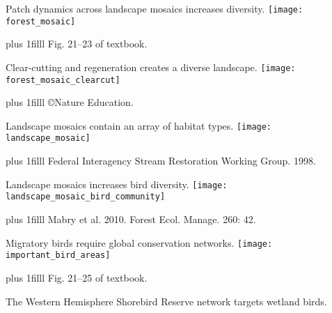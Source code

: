 \documentclass[t]{beamer}
\newcommand\imagecredit[1]{%
	\vskip0pt plus 1filll \tiny #1}%
\begin{document}
\begin{frame}[t,plain]{Patch dynamics across landscape mosaics increases diversity.}
	\centering
		\texttt{[image: forest\_mosaic]}

	\imagecredit{\hfill Fig. 21–23 of textbook.}
\end{frame}

\begin{frame}[t,plain]{Clear-cutting and regeneration creates a diverse landscape.}
	\centering
		\texttt{[image: forest\_mosaic\_clearcut]}

	\imagecredit{\hfill\copyright Nature Education.}
\end{frame}

\begin{frame}[t,plain]{Landscape mosaics contain an array of habitat types.}
	\centering
		\texttt{[image: landscape\_mosaic]}

	\imagecredit{\hfill Federal Interagency Stream Restoration Working Group. 1998.}
\end{frame}

\begin{frame}[t,plain]{Landscape mosaics increases bird diversity.}
	\centering
		\texttt{[image: landscape\_mosaic\_bird\_community]}

	\imagecredit{\hfill Mabry et al. 2010. Forest Ecol. Manage. 260: 42.}
\end{frame}


\begin{frame}[t,plain]{Migratory birds require global conservation networks.}
	\centering
		\texttt{[image: important\_bird\_areas]}

	\imagecredit{\hfill Fig. 21–25 of textbook.}
\end{frame}

{
\begin{frame}[t,plain]{The Western Hemisphere Shorebird Reserve network targets wetland birds.}
\end{frame}
}
\end{document}

